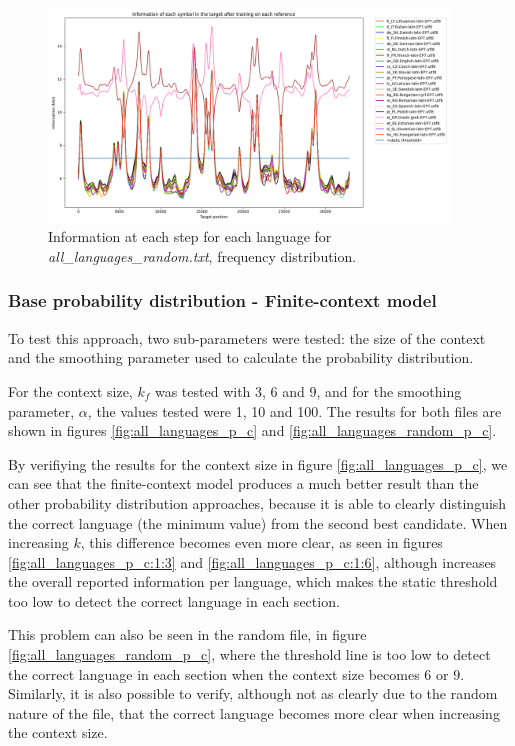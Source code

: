 \documentclass{article}
\begin{document}
\begin{figure}
    \centering
    \includegraphics[width=0.95\textwidth]{../results/all_languages_random/-p_f.png}
    \caption{Information at each step for each language for \textit{all\_languages\_random.txt}, frequency distribution.}
    \label{fig:all_languages_random_p_f}
\end{figure}

\subsubsection{Base probability distribution - Finite-context model}
\label{subsubsec:results_locate_lang_first_order_fcm}

To test this approach, two sub-parameters were tested: the size of the context and the smoothing parameter used to calculate the probability distribution.

For the context size, $k_f$ was tested with 3, 6 and 9, and for the smoothing parameter, $\alpha$, the values tested were 1, 10 and 100.
The results for both files are shown in figures \ref{fig:all_languages_p_c} and \ref{fig:all_languages_random_p_c}.

By verifiying the results for the context size in figure \ref{fig:all_languages_p_c}, we can see that the finite-context model produces a much better result than the other probability distribution approaches,
because it is able to clearly distinguish the correct language (the minimum value) from the second best candidate.
When increasing $k$, this difference becomes even more clear, as seen in figures \ref{fig:all_languages_p_c:1:3} and \ref{fig:all_languages_p_c:1:6}, %
although increases the overall reported information per language, which makes the static threshold too low to detect the correct language in each section.

This problem can also be seen in the random file, in figure \ref{fig:all_languages_random_p_c}, where the threshold line is too low to detect the correct language in each section when the context size
becomes $6$ or $9$.
Similarly, it is also possible to verify, although not as clearly due to the random nature of the file, that the correct language becomes more clear when increasing the context size.
\end{document}
